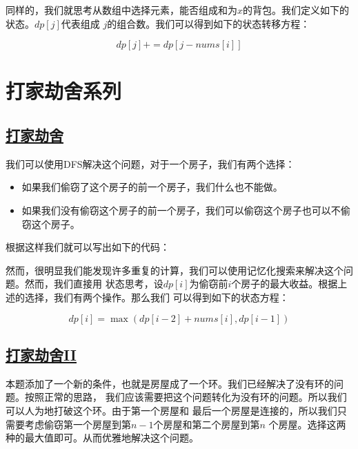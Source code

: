 \documentclass[../../main.tex]{subfiles}
\begin{document}
同样的，我们就思考从数组中选择元素，能否组成和为$x$的背包。我们定义如下的状态。$dp[j]$代表组成
$j$的组合数。我们可以得到如下的状态转移方程：

$$
dp[j] += dp[j - nums[i]]
$$



\section{打家劫舍系列}

\subsection{\href{https://leetcode-cn.com/problems/house-robber/}{打家劫舍}}

我们可以使用DFS解决这个问题，对于一个房子，我们有两个选择：

\begin{itemize}
  \item 如果我们偷窃了这个房子的前一个房子，我们什么也不能做。
  \item 如果我们没有偷窃这个房子的前一个房子，我们可以偷窃这个房子也可以不偷窃这个房子。
\end{itemize}

根据这样我们就可以写出如下的代码：



然而，很明显我们能发现许多重复的计算，我们可以使用记忆化搜索来解决这个问题。然而，我们直接用
状态思考，设$dp[i]$为偷窃前$i$个房子的最大收益。根据上述的选择，我们有两个操作。那么我们
可以得到如下的状态方程：

$$
dp[i] = \max(dp[i - 2] + nums[i], dp[i - 1])
$$



\subsection{\href{https://leetcode.cn/problems/house-robber-ii/}{打家劫舍II}}

本题添加了一个新的条件，也就是房屋成了一个环。我们已经解决了没有环的问题。按照正常的思路，
我们应该需要把这个问题转化为没有环的问题。所以我们可以人为地打破这个环。由于第一个房屋和
最后一个房屋是连接的，所以我们只需要考虑偷窃第一个房屋到第$n - 1$个房屋和第二个房屋到第$n$
个房屋。选择这两种的最大值即可。从而优雅地解决这个问题。
\end{document}
